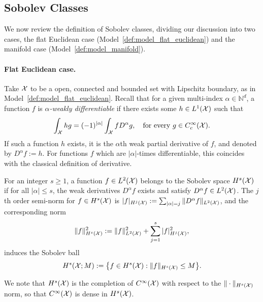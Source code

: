 \subsection{Sobolev Classes}
\label{sec:sobolev}
We now review the definition of Sobolev classes, dividing our discussion into two cases, the flat Euclidean case (Model~\ref{def:model_flat_euclidean}) and the manifold case (Model~\ref{def:model_manifold}).

\paragraph{Flat Euclidean case.}
Take $\mathcal{X}$ to be a open, connected and bounded set with Lipschitz boundary, as in Model~\ref{def:model_flat_euclidean}. Recall that for a given multi-index $\alpha \in \mathbb{N}^d$, a function $f$ is \emph{$\alpha$-weakly differentiable} if there exists some $h \in L^1(\mathcal{X})$ such that
\begin{equation*}
\int_{\mathcal{X}} h g = (-1)^{|\alpha|} \int_{\mathcal{X}} f D^{\alpha}g, \quad \textrm{for every $g \in C_c^{\infty}(\mathcal{X})$.}
\end{equation*}
If such a function $h$ exists, it is the $\alpha$th weak partial derivative of $f$, and denoted by $D^{\alpha}f := h$. For functions $f$ which are $|\alpha|$-times differentiable, this coincides with the classical definition of derivative.

\begin{definition}
	\label{def:sobolev_space}
	For an integer $s \geq 1$, a function $f \in L^2(\mathcal{X})$ belongs to the Sobolev space $H^s(\mathcal{X})$ if for all $|\alpha| \leq s$, the weak derivatives $D^{\alpha}f$ exists and satisfy $D^{\alpha}f \in L^2(\mathcal{X})$. The $j$th order semi-norm for $f \in H^s(\mathcal{X})$ is $|f|_{H^j(\mathcal{X})} := \sum_{|\alpha| = j}\|D^{\alpha}f\|_{L^2(\mathcal{X})}$, and the corresponding norm
	\begin{equation*}
	\|f\|_{H^s(\mathcal{X})}^2 := \|f\|_{L^2(\mathcal{X})}^2 + \sum_{j = 1}^{s} |f|_{H^j(\mathcal{X})}^2,
	\end{equation*}
	induces the Sobolev ball
	\begin{equation*}
	H^s(\mathcal{X};M) := \bigl\{f \in H^s(\mathcal{X}): \|f\|_{H^s(\mathcal{X})} \leq M\bigr\}.
	\end{equation*} 
\end{definition}
We note that $H^s(\mathcal{X})$ is the completion of $C^{\infty}(\mathcal{X})$ with respect to the $\|\cdot\|_{H^s(\mathcal{X})}$ norm, so that $C^{\infty}(\mathcal{X})$ is dense in $H^s(\mathcal{X})$. 

